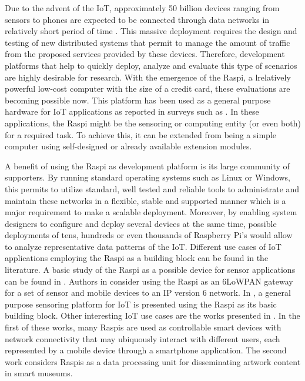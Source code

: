 %

Due to the advent of the \ac{IoT}, approximately 50 billion devices
ranging from sensors to phones are expected to be connected through
data networks in relatively short period of time \cite{cisco2011forecast}.
This massive deployment requires the design and testing of new
distributed systems that permit to manage the amount of traffic
from the proposed services provided by these devices. Therefore,
development platforms that help to quickly deploy, analyze and
evaluate this type of scenarios are highly desirable for research.
With the emergence of the \ac{Raspi}, a lrelatively powerful low-cost
computer with the size of a credit card, these evaluations are becoming
possible now. This platform has been used as a general purpose hardware
for \ac{IoT} applications as reported in surveys such as
\cite{alfuqaha2015iot}. In these applications, the
\ac{Raspi} might be the sensoring or computing entity (or even both) for
a required task. To achieve this, it can be extended from being a
simple computer using self-designed or already available extension modules.

A benefit of using the \ac{Raspi} as development platform is its large
community of supporters. By running standard operating systems such as
Linux or Windows, this permits to utilize standard, well tested and
reliable tools to administrate and maintain these networks in
a flexible, stable and supported manner which is a major requirement
to make a scalable deployment. Moreover, by enabling system designers to
configure and deploy several devices at the same time, possible deployments
of tens, hundreds or even thousands of Raspberry Pi's would allow to
analyze representative data patterns of the \ac{IoT}. Different use cases of
\ac{IoT} applications employing the \ac{Raspi} as a building block can be found
in the literature. A basic study of the \ac{Raspi} as a possible device
for sensor applications can be found in \cite{vujovic2014raspberry}.
Authors in \cite{kruger2015rapid} consider using the \ac{Raspi} as an
\ac{6LoWPAN} gateway for a set of sensor and mobile devices to an
\ac{IP} version 6 network. In \cite{mahmoud2016sensorian}, a general
purpose sensoring platform for \ac{IoT} is presented using the \ac{Raspi}
as its basic building block. Other interesting \ac{IoT} use cases
are the works presented in \cite{wirz2015enabling,alletto2016indoor}. In the first
of these works, many \ac{Raspi}s are used as controllable smart devices
with network connectivity that may ubiquously interact with different users,
each represented by a mobile device through a smartphone application.
The second work considers \ac{Raspi}s as a data processing unit
for disseminating artwork content in smart museums.


